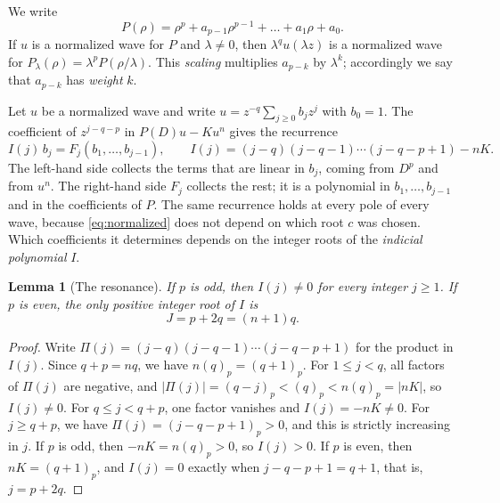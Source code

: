 \documentclass[11pt]{article}
\newtheorem{lemma}[theorem]{Lemma}
\theoremstyle{definition}
\theoremstyle{remark}
\numberwithin{equation}{section}
\begin{document}
We write
\[
 P(\rho)=\rho^p+a_{p-1}\rho^{p-1}+\dots+a_1\rho+a_0 .
\]
If \(u\) is a normalized wave for \(P\) and \(\lambda\ne0\), then
\(\lambda^qu(\lambda z)\) is a normalized wave for
\(P_\lambda(\rho)=\lambda^pP(\rho/\lambda)\). This \emph{scaling}
multiplies \(a_{p-k}\) by \(\lambda^k\); accordingly we say that
\(a_{p-k}\) has \emph{weight} \(k\).

Let \(u\) be a normalized wave and write
\(u=z^{-q}\sum_{j\ge0}b_jz^j\) with \(b_0=1\). The coefficient of
\(z^{j-q-p}\) in \(P(D)u-Ku^n\) gives the recurrence
\begin{equation}\label{eq:recurrence}
 I(j)\,b_j=F_j(b_1,\dots,b_{j-1}),\qquad
 I(j)=(j-q)(j-q-1)\cdots(j-q-p+1)-nK .
\end{equation}
The left-hand side collects the terms that are linear in \(b_j\),
coming from \(D^p\) and from \(u^n\). The right-hand side \(F_j\)
collects the rest; it is a polynomial in \(b_1,\dots,b_{j-1}\) and in
the coefficients of \(P\). The same recurrence holds at every pole of
every wave, because \eqref{eq:normalized} does not depend on which root
\(c\) was chosen. Which coefficients it determines depends on the
integer roots of the \emph{indicial polynomial} \(I\).

\begin{lemma}[The resonance]\label{lem:resonance}
If \(p\) is odd, then \(I(j)\ne0\) for every integer \(j\ge1\). If
\(p\) is even, the only positive integer root of \(I\) is
\[
 J=p+2q=(n+1)q .
\]
\end{lemma}

\begin{proof}
Write \(\Pi(j)=(j-q)(j-q-1)\cdots(j-q-p+1)\) for the product in
\(I(j)\). Since \(q+p=nq\), we have \(n(q)_p=(q+1)_p\). For
\(1\le j<q\), all factors of \(\Pi(j)\) are negative, and
\(|\Pi(j)|=(q-j)_p<(q)_p<n(q)_p=|nK|\), so \(I(j)\ne0\). For
\(q\le j<q+p\), one factor
vanishes and \(I(j)=-nK\ne0\). For \(j\ge q+p\), we have
\(\Pi(j)=(j-q-p+1)_p>0\), and this is strictly increasing in \(j\). If
\(p\) is odd, then \(-nK=n(q)_p>0\), so \(I(j)>0\). If \(p\) is even,
then \(nK=(q+1)_p\), and \(I(j)=0\) exactly when \(j-q-p+1=q+1\), that
is, \(j=p+2q\).
\end{proof}
\end{document}
